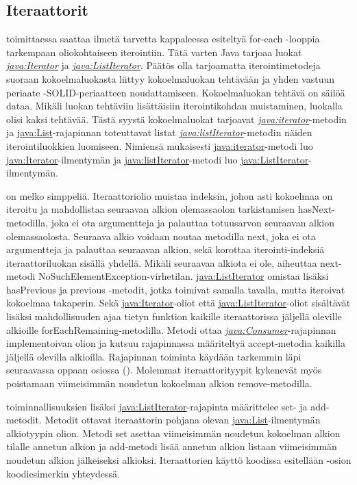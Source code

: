 \documentclass[a4paper,justified,notoc]{tufte-book}
\newcommand{\java}[1]{\underline{\gls{java:#1}}}
\newcommand{\newjava}[1]{\textit{\java{#1}}}
\begin{document}
\begin{fullwidth}
\subsection{Iteraattorit}
\label{iterators}

 toimittaessa saattaa ilmetä tarvetta kappaleessa 
esiteltyä for-each -looppia tarkempaan oliokohtaiseen iterointiin. Tätä varten Java tarjoaa luokat
\newjava{Iterator} ja \newjava{ListIterator}. Päätös olla tarjoamatta iterointimetodeja suoraan
kokoelmaluokasta liittyy kokoelmaluokan tehtävään ja \gls{yhden vastuun periaate}
-SOLID-periaatteen noudattamiseen. Kokoelmaluokan tehtävä on säilöä dataa. Mikäli luokan
tehtäviin lisättäisiin iterointikohdan muistaminen, luokalla olisi kaksi tehtävää. Tästä syystä
kokoelmaluokat tarjoavat \newjava{iterator}-metodin ja \java{List}-rajapinnan toteuttavat listat
\newjava{listIterator}-metodin näiden iterointiluokkien luomiseen. Nimiensä mukaisesti
\java{iterator}-metodi luo \java{Iterator}-ilmentymän ja \java{listIterator}-metodi luo
\java{ListIterator}-ilmentymän.

 on melko simppeliä. Iteraattoriolio muistaa indeksin, johon
asti kokoelmaa on iteroitu ja mahdollistaa seuraavan alkion olemassaolon tarkistamisen
hasNext-metodilla, joka ei ota argumentteja ja palauttaa totuusarvon seuraavan alkion
olemassaolosta. Seuraava alkio voidaan noutaa metodilla next, joka ei ota argumentteja ja
palauttaa seuraavan alkion, sekä korottaa iterointi-indeksiä iteraattoriluokan sisällä
yhdellä. Mikäli seuraavaa alkiota ei ole, aiheuttaa next-metodi
NoSuchElementException-virhetilan. \java{ListIterator} omistaa lisäksi hasPrevious ja previous
-metodit, jotka toimivat samalla tavalla, mutta iteroivat kokoelmaa takaperin. Sekä
\java{Iterator}-oliot että \java{ListIterator}-oliot sisältävät lisäksi mahdollisuuden ajaa
tietyn funktion kaikille iteraattorissa jäljellä oleville alkioille forEachRemaining-metodilla.
Metodi ottaa \newjava{Consumer}-rajapinnan implementoivan olion ja kutsuu rajapinnassa
määriteltyä accept-metodia kaikilla jäljellä olevilla alkioilla. Rajapinnan toiminta käydään
tarkemmin läpi seuraavassa oppaan osiossa (). Molemmat iteraattorityypit
kykenevät myös poistamaan viimeisimmän noudetun kokoelman alkion remove-metodilla.

 toiminnallisuuksien lisäksi \java{ListIterator}-rajapinta
määrittelee set- ja add-metodit. Metodit ottavat iteraattorin pohjana olevan 
\java{List}-ilmentymän alkiotyypin olion. Metodi set asettaa viimeisimmän noudetun kokoelman
alkion tilalle annetun alkion ja add-metodi lisää annetun alkion listaan viimeisimmän noudetun
alkion jälkeiseksi alkioksi. Iteraattorien käyttö koodissa esitellään -osion
koodiesimerkin yhteydessä.


\end{fullwidth}
\end{document}

